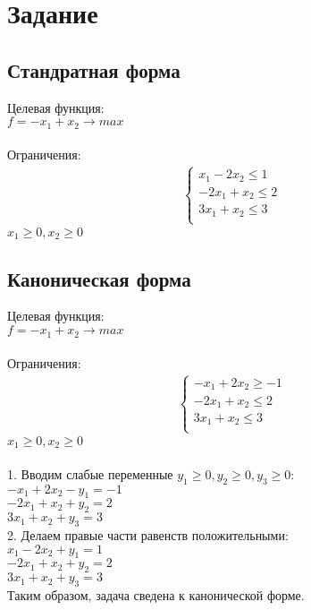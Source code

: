 \documentclass[14pt,a4paper,fleqn]{extarticle}
\begin{document}
\section*{Задание}
\subsection*{Стандратная форма}
Целевая функция:\\
$f = -x_1+x_2 \longrightarrow max$\\\\
Ограничения:
\begin{align*}
	\begin{cases}
		x_1 - 2x_2 \leq 1\\
		-2x_1 + x_2 \leq 2\\
		3x_1 + x_2 \leq 3\\
	\end{cases}
\end{align*}
$x_1 \geq 0, x_2 \geq 0$
\newpage
\subsection*{Каноническая форма}
Целевая функция:\\
$f = -x_1+x_2 \longrightarrow max$\\\\
Ограничения:
\begin{align*}
	\begin{cases}
		-x_1 + 2x_2 \geq -1\\
		-2x_1 + x_2 \leq 2\\
		3x_1 + x_2 \leq 3\\
	\end{cases}
\end{align*}
$x_1 \geq 0, x_2 \geq 0$\\\\
1. Вводим слабые переменные $y_1 \geq 0, y_2 \geq 0, y_3 \geq 0$:\\
$-x_1 + 2x_2 - y_1 = -1$\\
$-2x_1 + x_2 + y_2 = 2$\\
$3x_1 + x_2 + y_3 = 3$\\

2. Делаем правые части равенств положительными:\\
$x_1 - 2x_2 + y_1 = 1$\\
$-2x_1 + x_2 + y_2 = 2$\\
$3x_1 + x_2 + y_3 = 3$\\

Таким образом, задача сведена к канонической форме.
\end{document}

